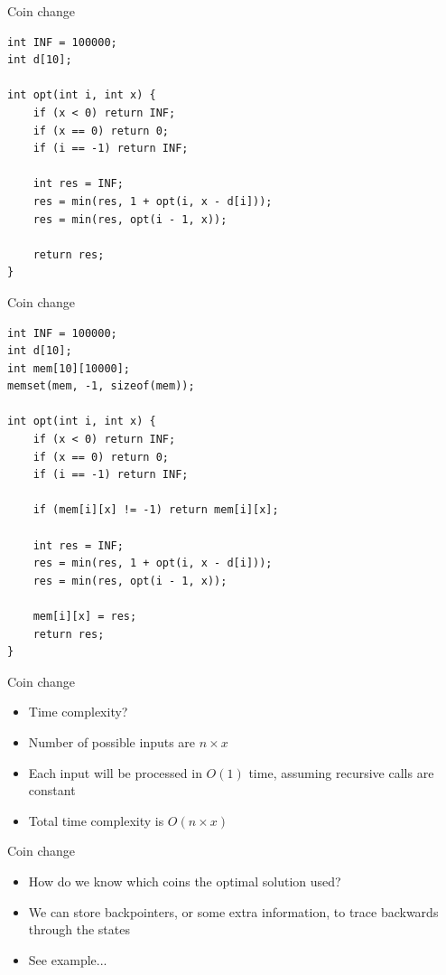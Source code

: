 \documentclass{beamer}
\begin{document}
\begin{frame}{Coin change}
    \begin{verbatim}
int INF = 100000;
int d[10];

int opt(int i, int x) {
    if (x < 0) return INF;
    if (x == 0) return 0;
    if (i == -1) return INF;

    int res = INF;
    res = min(res, 1 + opt(i, x - d[i]));
    res = min(res, opt(i - 1, x));

    return res;
}
    \end{verbatim}
\end{frame}

\begin{frame}{Coin change}
    \begin{verbatim}
int INF = 100000;
int d[10];
int mem[10][10000];
memset(mem, -1, sizeof(mem));

int opt(int i, int x) {
    if (x < 0) return INF;
    if (x == 0) return 0;
    if (i == -1) return INF;

    if (mem[i][x] != -1) return mem[i][x];

    int res = INF;
    res = min(res, 1 + opt(i, x - d[i]));
    res = min(res, opt(i - 1, x));

    mem[i][x] = res;
    return res;
}
    \end{verbatim}
\end{frame}

\begin{frame}[plain]{Coin change}
    \vspace{30pt}
    \begin{itemize}
        \item Time complexity?
        \item Number of possible inputs are $n \times x$
        \item Each input will be processed in $O(1)$ time, assuming recursive calls are constant
        \item Total time complexity is $O(n\times x)$
    \end{itemize}
\end{frame}

\begin{frame}[plain]{Coin change}
    \begin{itemize}
        \vspace{30pt}
        \item How do we know which coins the optimal solution used?
        \item We can store backpointers, or some extra information, to trace backwards through the states
        \item See example...
    \end{itemize}
\end{frame}
\end{document}
